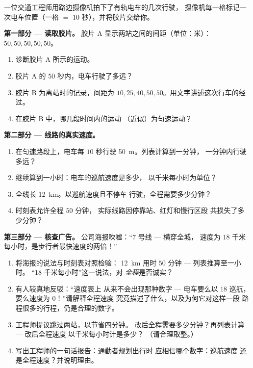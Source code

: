 \begin{problem}\label{pb:g6:describing-motion:1}
一位交通工程师用路边摄像机拍下了有轨电车的几次行驶，
摄像机每一格标记一次电车位置（一格 $=$ $10$
秒），并将胶片交给你。

\medskip\noindent\textbf{第一部分 --- 读取胶片。}
胶片 A 显示两站之间的间距（单位：米）：
$50, 50, 50, 50, 50$。
\begin{enumerate}
  \item 诊断胶片 A 所示的运动。
  \item 胶片 A 的 $50$ 秒内，电车行驶了多远？
  \item 胶片 B 为离站时的记录，间距为
        $10, 25, 40, 50, 50$。用文字讲述这次行车的经过。
  \item 在胶片 B 中，哪几段时间内的运动
        （近似）为匀速运动？
\end{enumerate}

\medskip\noindent\textbf{第二部分 --- 线路的真实速度。}
\begin{enumerate}[resume]
  \item 在匀速路段上，电车每
        $10$ 秒行驶 \qty{50}{m}。列表计算到一分钟，
        一分钟内行驶多远？
  \item 继续算到一小时：电车的巡航速度是多少，
        以千米每小时为单位？
  \item 全线长 \qty{12}{km}。以巡航速度且不停车
        行驶，全程需要多少分钟？
  \item 时刻表允许全程 $50$ 分钟，
        实际线路因停靠站、红灯和慢行区段
        共损失了多少分钟？
\end{enumerate}

\medskip\noindent\textbf{第三部分 --- 核查广告。}
公司海报吹嘘：“7 号线 --- 横穿全城，
速度为 $18$ 千米每小时，是步行者最快速度的两倍！”
\begin{enumerate}[resume]
  \item 将海报的说法与时刻表对照检验：
        \qty{12}{km} 用时 $50$ 分钟 --- 列表推算至一小时。
        “$18$ 千米每小时”这一说法，对
        \emph{全程}是否诚实？
  \item 有人较真地反驳：“速度表上
        从来不会出现那种数字 --- 电车要么以 $18$ 巡航，
        要么速度为 $0$！”请解释全程速度
        究竟描述了什么，以及为何它对这样一段
        路程很多的行程，仍是合理的数字。
  \item 工程师提议跳过两站，以节省四分钟。
        改后全程需要多少分钟？再列表计算 --- 改后全程速度
        以千米每小时计是多少？
        （请合理取整。）
  \item 写出工程师的一句话报告：通勤者规划出行时
        应相信哪个数字：巡航速度
        还是全程速度？并说明理由。
\end{enumerate}
\end{problem}
